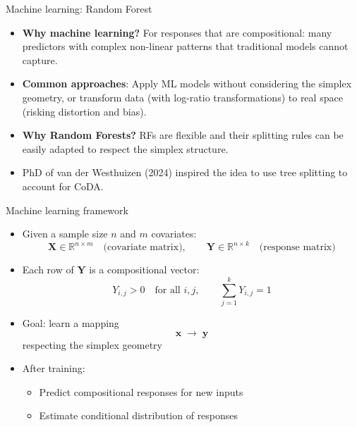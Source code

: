 \begin{frame}{Machine learning: Random Forest}

\begin{itemize}
  \item \textbf{Why machine learning?}
    For responses that are compositional: many predictors with complex non-linear patterns that traditional models cannot capture.

  \item \textbf{Common approaches}:
    Apply ML models without considering the simplex geometry, or transform data (with log-ratio transformations) to real space (risking distortion and bias).

  \item \textbf{Why Random Forests?}
    RFs are flexible and their splitting rules can be easily adapted to respect the simplex structure.

  \item PhD of van der Westhuizen (2024) inspired the idea to use tree splitting to account for CoDA.
\end{itemize}

\end{frame}


\begin{frame}{Machine learning framework}

\begin{itemize}
  \item[\textcolor{blue}{\large$\blacktriangleright$}] Given a sample size $n$ and $m$ covariates:
    \[
      \mathbf{X} \in \mathbb{R}^{n \times m} \quad \text{(covariate matrix)}, \qquad
      \mathbf{Y} \in \mathbb{R}^{n \times k} \quad \text{(response matrix)}
    \]

  \item[\textcolor{blue}{\large$\blacktriangleright$}] Each row of $\mathbf{Y}$ is a compositional vector:
    \[
      Y_{i,j} > 0 \quad \text{for all } i, j, \qquad \sum_{j=1}^k Y_{i,j} = 1
    \]

  \item[\textcolor{blue}{\large$\blacktriangleright$}] Goal: learn a mapping
    \[ \mathbf{x} \;\longrightarrow\; \mathbf{y} \]
    respecting the simplex geometry
    \vspace{0.8em}

  \item[\textcolor{blue}{\large$\blacktriangleright$}] After training:
    \begin{itemize}
      \item Predict compositional responses for new inputs
      \item Estimate conditional distribution of responses
    \end{itemize}
\end{itemize}

\end{frame}


